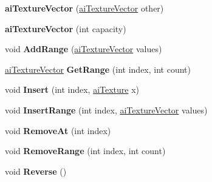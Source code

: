 \begin{DoxyCompactItemize}
\item 
\hypertarget{classai_texture_vector_af83e8976b663a8b99f4b6c45e3d6dfb8}{{\bfseries ai\+Texture\+Vector} (\hyperlink{classai_texture_vector}{ai\+Texture\+Vector} other)}\label{classai_texture_vector_af83e8976b663a8b99f4b6c45e3d6dfb8}

\item 
\hypertarget{classai_texture_vector_a77762b528970bf0c1ef5e3151cba073a}{{\bfseries ai\+Texture\+Vector} (int capacity)}\label{classai_texture_vector_a77762b528970bf0c1ef5e3151cba073a}

\item 
\hypertarget{classai_texture_vector_a4ccc9290d0301c97fd7766d47dd92bf4}{void {\bfseries Add\+Range} (\hyperlink{classai_texture_vector}{ai\+Texture\+Vector} values)}\label{classai_texture_vector_a4ccc9290d0301c97fd7766d47dd92bf4}

\item 
\hypertarget{classai_texture_vector_a9083aecf8458a4c8e6dd7b75ee61dbd9}{\hyperlink{classai_texture_vector}{ai\+Texture\+Vector} {\bfseries Get\+Range} (int index, int count)}\label{classai_texture_vector_a9083aecf8458a4c8e6dd7b75ee61dbd9}

\item 
\hypertarget{classai_texture_vector_a204ba398da69328af7346d3c0498d925}{void {\bfseries Insert} (int index, \hyperlink{structai_texture}{ai\+Texture} x)}\label{classai_texture_vector_a204ba398da69328af7346d3c0498d925}

\item 
\hypertarget{classai_texture_vector_a4f3143bfaf7362e8af3e07e2de70bdd1}{void {\bfseries Insert\+Range} (int index, \hyperlink{classai_texture_vector}{ai\+Texture\+Vector} values)}\label{classai_texture_vector_a4f3143bfaf7362e8af3e07e2de70bdd1}

\item 
\hypertarget{classai_texture_vector_a23bd9e8ab2f971589be0595367bcd830}{void {\bfseries Remove\+At} (int index)}\label{classai_texture_vector_a23bd9e8ab2f971589be0595367bcd830}

\item 
\hypertarget{classai_texture_vector_a9dac5f3bbc8283f2c22564b24b03502e}{void {\bfseries Remove\+Range} (int index, int count)}\label{classai_texture_vector_a9dac5f3bbc8283f2c22564b24b03502e}

\item 
\hypertarget{classai_texture_vector_a9d9e3c4e9024143619924e213e8186ae}{void {\bfseries Reverse} ()}\label{classai_texture_vector_a9d9e3c4e9024143619924e213e8186ae}


\end{DoxyCompactItemize}
